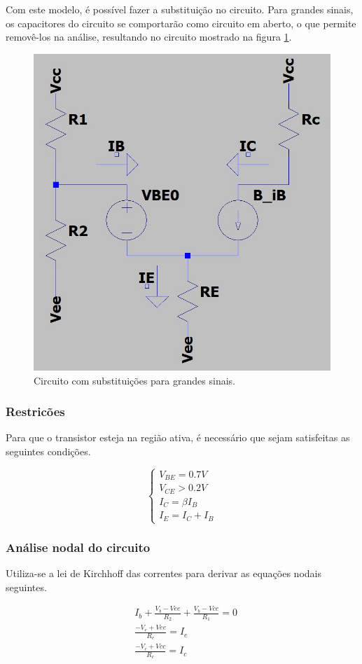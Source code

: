 Com este modelo, é possível fazer a substituição no circuito. Para grandes sinais, os capacitores do circuito se comportarão como circuito em aberto, o que permite removê-los na análise, resultando no circuito mostrado na figura \ref*{fig:circuito_grandes_sinais}.

\begin{figure}[H]
    \centering
    \includegraphics[width=0.3\columnwidth]{images/circuitos_grandes_sinais.png}
    \caption{Circuito com substituições para grandes sinais.}
    \label{fig:circuito_grandes_sinais}
\end{figure}

\subsubsection{Restricões}

Para que o transistor esteja na região ativa, é necessário que sejam satisfeitas as seguintes condições.

\begin{equation}
    \begin{cases}
        V_{BE} = 0.7 V  \\
        V_{CE} > 0.2 V  \\
        I_C = \beta I_B \\
        I_E = I_C + I_B
    \end{cases}
    \label{eq:restricoes_grandes_sinais}
\end{equation}

\subsubsection{Análise nodal do circuito}

Utiliza-se a lei de Kirchhoff das correntes para derivar as equações nodais seguintes.

\begin{equation}
    \begin{aligned}
         & I_{b} + \frac{V_{b} - Vee}{R_{2}} + \frac{V_{b} - Vcc}{R_{1}} = 0 \\
         & \frac{- V_{e} + Vee}{R_{e}} = I_{e}                               \\
         & \frac{- V_{c} + Vcc}{R_{c}} = I_{c}                               \\
    \end{aligned}
    \label{eq:analise_nodal_grandes_sinais}
\end{equation}

